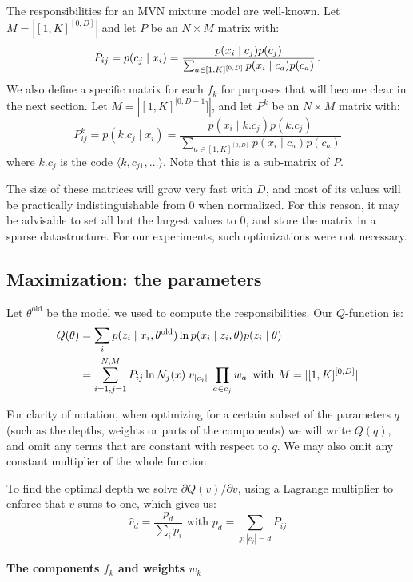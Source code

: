 The responsibilities for an MVN mixture model are well-known. Let $M = |[1, K]^{[0, D]}|$ and let $P$ be an $N\times M$ matrix with: 
\[
P_{ij} = p(c_j \mid x_i) = \frac{p(x_i\mid c_j) p(c_j) }{\sum_{a \in [1,K]^{[0, D]}} p(x_i\mid c_a) p(c_a)} \,\text{.} 
\]
We also define a specific matrix for each $f_k$ for purposes that will become clear in the next section. Let $M = |[1, K]^{[0, D-1}]|$, and let $P^k$ be an $N \times M$ matrix with: 
\[
P_{ij}^k = p(k.c_j \mid x_i) = \frac{p(x_i\mid k.c_j) p(k.c_j) }{\sum_{a \in [1,K]^{[0, D]}} p(x_i\mid c_a) p(c_a)} 
\]
where $k.c_j$ is the code $\langle k, c_{j1}, \ldots\rangle$. Note that this is a sub-matrix of $P$.

The size of these matrices will grow very fast with $D$, and most of its values will be practically indistinguishable from $0$ when normalized. For this reason, it may be advisable to set all but the largest values to $0$, and store the matrix in a sparse datastructure. For our experiments, such optimizations were not necessary.

\subsection{Maximization: the parameters}

Let $\theta^\text{old}$ be the model we used to compute the responsibilities. Our $Q$-function is:
\begin{align*}
Q(\theta) &= \sum_{i} p(z_i \mid x_i, \theta^\text{old}) \ln p(x_i \mid z_i, \theta) p (z_i \mid \theta) \\
     &= \sum_{i=1,j=1}^{N, M} P_{ij} \ln {\cal N}_j(x) \;v_{|c_j|}\; \prod_{a\in c_j}w_a \,\,\, \text{with } M = |[1,K]^{[0,D]}|
\end{align*}

For clarity of notation, when optimizing for a certain subset of the parameters $q$ (such as the depths, weights or parts of the components) we will write $Q(q)$, and omit any terms that are constant with respect to $q$. We may also omit any constant multiplier of the whole function.

To find the optimal depth we solve $\partial Q(v)/\partial v$, using a Lagrange multiplier to enforce that $v$ sums to one, which gives us:
\[
\hat v_d = \frac{p_d}{\sum_i p_i} \,\,\text{with } p_d = \sum_{j: |c_j| = d} P_{ij}
\]

\paragraph{The components $f_k$ and weights $w_k$}

